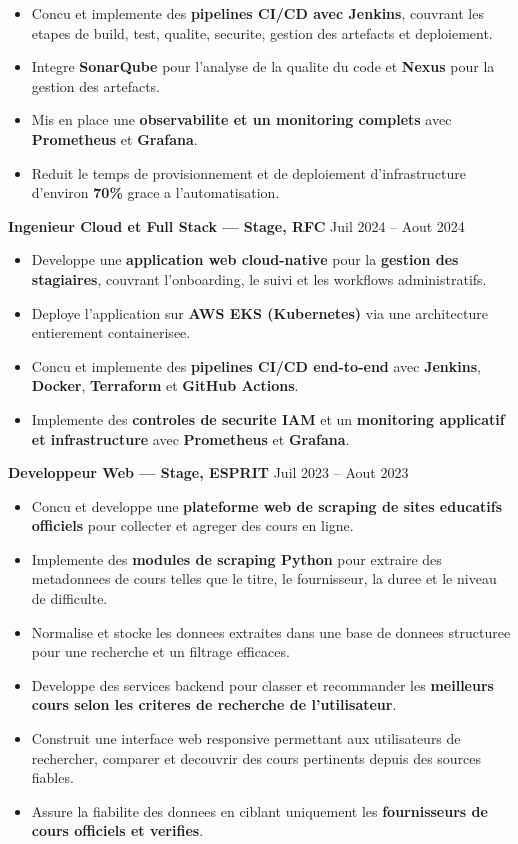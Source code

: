 \documentclass[10pt, letterpaper]{article}
\newenvironment{highlights}{
\begin{itemize}[leftmargin=12pt, itemsep=2pt]
}{
\end{itemize}
}
\begin{document}
\begin{highlights}
\item Concu et implemente des \textbf{pipelines CI/CD avec Jenkins}, couvrant les etapes de build, test, qualite, securite, gestion des artefacts et deploiement.
\item Integre \textbf{SonarQube} pour l'analyse de la qualite du code et \textbf{Nexus} pour la gestion des artefacts.
\item Mis en place une \textbf{observabilite et un monitoring complets} avec \textbf{Prometheus} et \textbf{Grafana}.
\item Reduit le temps de provisionnement et de deploiement d'infrastructure d'environ \textbf{70\%} grace a l'automatisation.
\end{highlights}

\textbf{Ingenieur Cloud et Full Stack --- Stage, RFC} \hfill Juil 2024 -- Aout 2024
\begin{highlights}
\item Developpe une \textbf{application web cloud-native} pour la \textbf{gestion des stagiaires}, couvrant l'onboarding, le suivi et les workflows administratifs.
\item Deploye l'application sur \textbf{AWS EKS (Kubernetes)} via une architecture entierement containerisee.
\item Concu et implemente des \textbf{pipelines CI/CD end-to-end} avec \textbf{Jenkins}, \textbf{Docker}, \textbf{Terraform} et \textbf{GitHub Actions}.
\item Implemente des \textbf{controles de securite IAM} et un \textbf{monitoring applicatif et infrastructure} avec \textbf{Prometheus} et \textbf{Grafana}.
\end{highlights}

\textbf{Developpeur Web --- Stage, ESPRIT} \hfill Juil 2023 -- Aout 2023
\begin{highlights}
\item Concu et developpe une \textbf{plateforme web de scraping de sites educatifs officiels} pour collecter et agreger des cours en ligne.
\item Implemente des \textbf{modules de scraping Python} pour extraire des metadonnees de cours telles que le titre, le fournisseur, la duree et le niveau de difficulte.
\item Normalise et stocke les donnees extraites dans une base de donnees structuree pour une recherche et un filtrage efficaces.
\item Developpe des services backend pour classer et recommander les \textbf{meilleurs cours selon les criteres de recherche de l'utilisateur}.
\item Construit une interface web responsive permettant aux utilisateurs de rechercher, comparer et decouvrir des cours pertinents depuis des sources fiables.
\item Assure la fiabilite des donnees en ciblant uniquement les \textbf{fournisseurs de cours officiels et verifies}.
\end{highlights}
\end{document}
